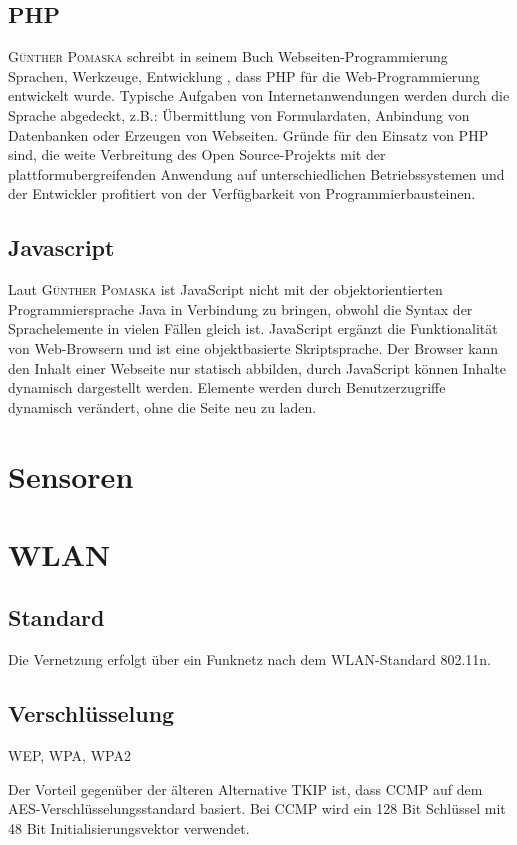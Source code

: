 \subsection{\ac{PHP}}
\textsc{Günther Pomaska} schreibt in seinem Buch Webseiten-Programmierung Sprachen, Werkzeuge, Entwicklung \cite{pomaska2012webseiten-programmierung}, dass \ac{PHP} für die Web-Programmierung entwickelt wurde. Typische Aufgaben von Internetanwendungen werden durch die Sprache abgedeckt, z.B.: Übermittlung von Formulardaten, Anbindung von Datenbanken oder Erzeugen von Webseiten. Gründe für den Einsatz von \ac{PHP} sind, die weite Verbreitung des Open Source-Projekts mit der plattformubergreifenden Anwendung auf unterschiedlichen Betriebssystemen und der Entwickler profitiert von der Verfügbarkeit von Programmierbausteinen.

\subsection{Javascript}
Laut \textsc{Günther Pomaska} \cite{pomaska2012webseiten-programmierung} ist JavaScript nicht mit der objektorientierten Programmiersprache Java in Verbindung zu bringen, obwohl die Syntax der Sprachelemente in vielen Fällen gleich ist. JavaScript ergänzt die Funktionalität von Web-Browsern und ist eine objektbasierte Skriptsprache. Der Browser kann den Inhalt einer Webseite nur statisch abbilden, durch JavaScript können Inhalte dynamisch dargestellt werden. Elemente werden durch Benutzerzugriffe dynamisch verändert, ohne die Seite neu zu laden.

\section{Sensoren}

\section{WLAN}
\subsection{Standard}

Die Vernetzung erfolgt über ein Funknetz nach dem WLAN-Standard 802.11n. 

\subsection{Verschlüsselung}
WEP, WPA, WPA2

Der Vorteil gegenüber der älteren Alternative TKIP ist, dass \ac{CCMP} auf dem AES-Verschlüsselungsstandard basiert. Bei \ac{CCMP} wird ein 128 Bit Schlüssel mit 48 Bit Initialisierungsvektor verwendet.


